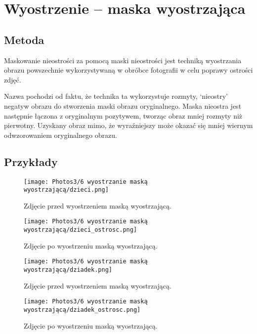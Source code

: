 \documentclass[]{mwart}
\begin{document}
\section{Wyostrzenie -- maska wyostrzająca      }

\subsection{Metoda}
Maskowanie nieostrości za pomocą maski nieostrości jest techniką wyostrzania obrazu
powszechnie wykorzystywaną w obróbce fotografii w celu poprawy ostrości zdjęć.

Nazwa pochodzi od faktu, że technika ta wykorzystuje rozmyty,
`nieostry' negatyw obrazu do stworzenia maski obrazu oryginalnego.
Maska nieostra jest następnie łączona z oryginalnym pozytywem,
tworząc obraz mniej rozmyty niż pierwotny. Uzyskany obraz mimo, że wyraźniejszy
może okazać się mniej wiernym odwzorowaniem oryginalnego obrazu.

\subsection{Przykłady}
\begin{figure}[H]
    \centering
    \texttt{[image: Photos3/6 wyostrzanie maską wyostrzającą/dzieci.png]}
    \caption{Zdjęcie przed wyostrzeniem maską wyostrzającą.}
\end{figure}
\begin{figure}[H]
    \centering
    \texttt{[image: Photos3/6 wyostrzanie maską wyostrzającą/dzieci\_ostrosc.png]}
    \caption{Zdjęcie po wyostrzeniu maską wyostrzającą.}
\end{figure}

\begin{figure}[H]
    \centering
    \texttt{[image: Photos3/6 wyostrzanie maską wyostrzającą/dziadek.png]}
    \caption{Zdjęcie przed wyostrzeniem maską wyostrzającą.}
\end{figure}
\begin{figure}[H]
    \centering
    \texttt{[image: Photos3/6 wyostrzanie maską wyostrzającą/dziadek\_ostrosc.png]}
    \caption{Zdjęcie po wyostrzeniu maską wyostrzającą.}
\end{figure}
\end{document}
